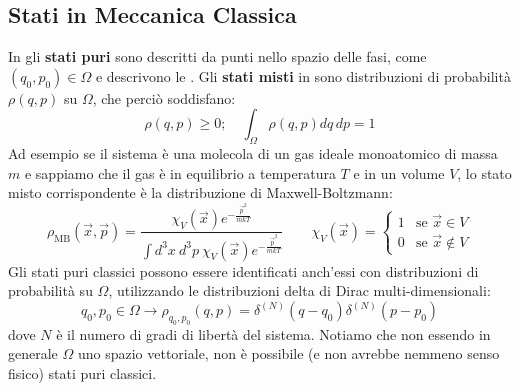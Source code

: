 \documentclass[FisicaTeorica.tex]{subfiles}
\begin{document}
\subsection{Stati in Meccanica Classica}
In \MC gli \textbf{stati puri} sono descritti da punti nello spazio delle fasi, come $(q_0,p_0)\in\Omega$ e descrivono le . 
Gli \textbf{stati misti} in \MC sono distribuzioni di probabilità $\rho(q,p)$ su $\Omega$, che perciò soddisfano:
\[
\rho(q,p)\geq 0; \quad \int_\Omega \rho(q,p) dq\,dp = 1
\]
Ad esempio se il sistema è una molecola di un gas ideale monoatomico di massa $m$ e sappiamo che il gas è in equilibrio a temperatura $T$ e in un volume $V$, lo stato misto corrispondente è la distribuzione di Maxwell-Boltzmann:
\[\rho_\text{MB}\left(\vec{x},\vec{p}\right)=\frac{\chi_V\left(\vec{x}\right)e^{-\frac{{\vec{p}}^2}{mkT}}}{\int d^3x\ d^3p\ \chi_V\left(\vec{x}\right)e^{-\frac{{\vec{p}}^2}{mkT}}}\quad \quad \chi_V(\vec{x}) = \begin{cases}
1 & \text{se }\vec{x}\in V\\
0 & \text{se }\vec{x}\notin V
\end{cases}
\]
Gli stati puri classici possono essere identificati anch'essi con distribuzioni di probabilità  su $\Omega$, utilizzando le distribuzioni delta di Dirac multi-dimensionali:
\[
q_0,p_0\in\Omega\rightarrow\rho_{q_0,p_0}\left(q,p\right)=\delta^{\left(N\right)}\left(q-q_0\right)\delta^{\left(N\right)}\left(p-p_0\right)
\]
dove $N$ è il numero di gradi di libertà del sistema.
Notiamo che non essendo in generale $\Omega$ uno spazio vettoriale, non è possibile (e non avrebbe nemmeno senso fisico)  stati puri classici.\\
\end{document}

